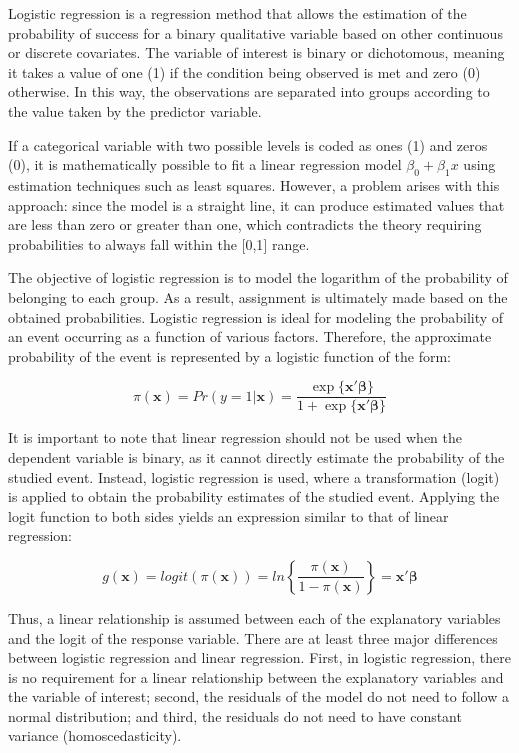 \documentclass[
  12pt,
]{book}
\begin{document}
Logistic regression is a regression method that allows the estimation of the probability of success for a binary qualitative variable based on other continuous or discrete covariates. The variable of interest is binary or dichotomous, meaning it takes a value of one (1) if the condition being observed is met and zero (0) otherwise. In this way, the observations are separated into groups according to the value taken by the predictor variable.

If a categorical variable with two possible levels is coded as ones (1) and zeros (0), it is mathematically possible to fit a linear regression model \(\beta_0 + \beta_1 x\) using estimation techniques such as least squares. However, a problem arises with this approach: since the model is a straight line, it can produce estimated values that are less than zero or greater than one, which contradicts the theory requiring probabilities to always fall within the {[}0,1{]} range.

The objective of logistic regression is to model the logarithm of the probability of belonging to each group. As a result, assignment is ultimately made based on the obtained probabilities. Logistic regression is ideal for modeling the probability of an event occurring as a function of various factors. Therefore, the approximate probability of the event is represented by a logistic function of the form:

\[
\pi(\textbf{x})= Pr(y = 1 | \textbf{x}) = \frac{\exp\{\textbf{x}'\boldsymbol{\beta}\}}{1+\exp\{\textbf{x}'\boldsymbol{\beta}\}}
\]

It is important to note that linear regression should not be used when the dependent variable is binary, as it cannot directly estimate the probability of the studied event. Instead, logistic regression is used, where a transformation (logit) is applied to obtain the probability estimates of the studied event. Applying the logit function to both sides yields an expression similar to that of linear regression:

\[
g(\textbf{x})=logit(\pi(\textbf{x}))=ln \left\{ \frac{\pi(\textbf{x})}{1-\pi(\textbf{x})} \right \}= \textbf{x}'\boldsymbol{\beta}
\]

Thus, a linear relationship is assumed between each of the explanatory variables and the logit of the response variable. There are at least three major differences between logistic regression and linear regression. First, in logistic regression, there is no requirement for a linear relationship between the explanatory variables and the variable of interest; second, the residuals of the model do not need to follow a normal distribution; and third, the residuals do not need to have constant variance (homoscedasticity).
\end{document}
